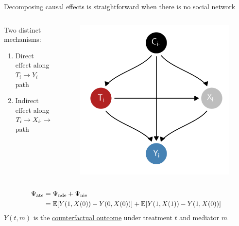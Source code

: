 \documentclass[aspectratio=169]{beamer}
\theoremstyle{remark}
\begin{document}
\begin{frame}{Decomposing causal effects is straightforward when there is no social network}
    \begin{columns}
        \begin{column}{0.65\textwidth}
            Two distinct mechanisms:
            \begin{enumerate}
                \item Direct effect along $T_i \to Y_i$ path
                \item Indirect effect along $T_i \to X_{i \cdot} \to Y_i$ path
            \end{enumerate}
        \end{column}
        \begin{column}{0.35\textwidth}
            \centering
            \begin{figure}[ht]
                \includegraphics[height=0.5\textheight]{figures/dags/mediating.png}
            \end{figure}
        \end{column}
    \end{columns}
    \begin{definition}
        \begin{equation*}
            \begin{aligned}
                \ate & = \nde + \nie                                               \\
                     & = \E{Y(1, X(0)) - Y(0, X(0))} + \E{Y(1, X(1)) - Y(1, X(0))}
            \end{aligned}
        \end{equation*}
        \centering
        $Y(t, m)$ is the \underline{counterfactual outcome} under treatment $t$ and mediator $m$
    \end{definition}
\end{frame}
\end{document}

